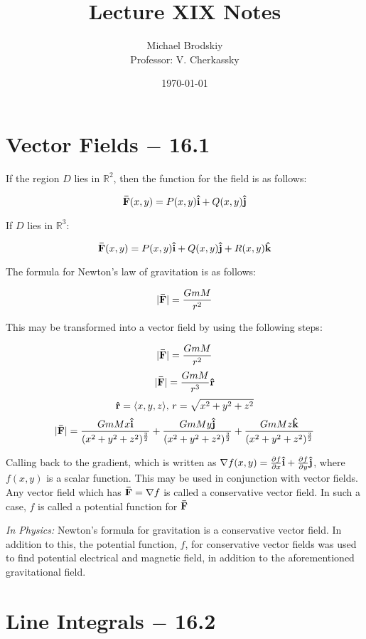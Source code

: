 \documentclass[12pt]{article}
\title{Lecture XIX Notes}
\date{\today}
\author{Michael Brodskiy\\ \small Professor: V. Cherkassky}
\begin{document}
\maketitle

\section{Vector Fields $-$ 16.1}

If the region $D$ lies in $\mathbb{R}^2$, then the function for the field is as follows:

$$\bold{\bar{F}}(x,y)=P(x,y)\bold{\hat{i}}+Q(x,y)\bold{\hat{j}}$$

If $D$ lies in $\mathbb{R}^3$:

$$\bold{\bar{F}}(x,y)=P(x,y)\bold{\hat{i}}+Q(x,y)\bold{\hat{j}}+R(x,y)\bold{\hat{k}}$$

The formula for Newton's law of gravitation is as follows:

$$|\bold{\bar{F}}|=\frac{GmM}{r^2}$$

This may be transformed into a vector field by using the following steps:

$$|\bold{\bar{F}}|=\frac{GmM}{r^2}$$
$$|\bold{\bar{F}}|=\frac{GmM}{r^3}\bold{\hat{r}}$$
$$\bold{\hat{r}}=\langle x, y, z\rangle,\,r=\sqrt{x^2+y^2+z^2}$$
$$|\bold{\bar{F}}|=\frac{GmMx\bold{\hat{i}}}{(x^2+y^2+z^2)^{\frac{3}{2}}}+\frac{GmMy\bold{\hat{j}}}{(x^2+y^2+z^2)^{\frac{3}{2}}}+\frac{GmMz\bold{\hat{k}}}{(x^2+y^2+z^2)^{\frac{3}{2}}}$$

Calling back to the gradient, which is written as $\nabla f(x,y)=\frac{\partial f}{\partial x}\bold{\hat{i}} + \frac{\partial f}{\partial y}\bold{\hat{j}}$, where $f(x,y)$ is a scalar function. This may be used in conjunction with vector fields.\\

Any vector field which has $\bold{\bar{F}}=\nabla f$ is called a conservative vector field. In such a case, $f$ is called a potential function for $\bold{\bar{F}}$ 

\textit{In Physics:}
Newton's formula for gravitation is a conservative vector field.
In addition to this, the potential function, $f$, for conservative vector fields was used to find potential electrical and magnetic field, in addition to the aforementioned gravitational field.


\section{Line Integrals $-$ 16.2}
\end{document}
